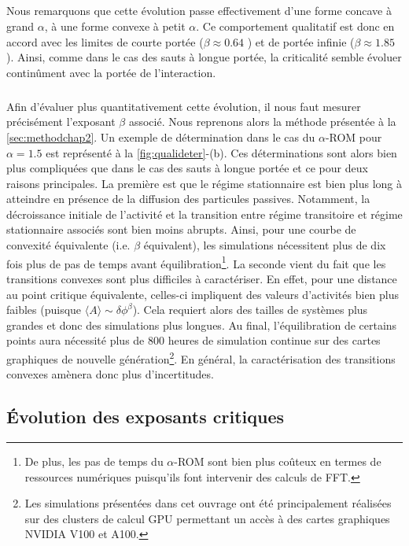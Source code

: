 \subparagraph{}Nous remarquons que cette évolution passe effectivement d'une forme concave à grand $\alpha$, à une forme convexe à petit $\alpha$. Ce comportement qualitatif est donc en accord avec les limites de courte portée ($\beta  \approx 0.64$ \cite{lubeck_universal_2004}) et de portée infinie ($\beta\approx 1.85$ \cite{mari_absorbing_2022}). Ainsi, comme dans le cas des sauts à longue portée, la criticalité semble évoluer continûment avec la portée de l'interaction.

\subparagraph{}Afin d'évaluer plus quantitativement cette évolution, il nous faut mesurer précisément l'exposant $\beta$ associé. Nous reprenons alors la méthode présentée à la \autoref{sec:methodchap2}. Un exemple de détermination dans le cas du $\alpha$-ROM pour $\alpha = 1.5$ est représenté à la \autoref{fig:qualideter}-(b). Ces déterminations sont alors bien plus compliquées que dans le cas des sauts à longue portée et ce pour deux raisons principales. La première est que le régime stationnaire est bien plus long à atteindre en présence de la diffusion des particules passives. Notamment, la décroissance initiale de l'activité et la transition entre régime transitoire et régime stationnaire associés sont bien moins abrupts. Ainsi, pour une courbe de convexité équivalente (i.e. $\beta$ équivalent), les simulations nécessitent plus de dix fois plus de pas de temps avant équilibration\footnote{De plus, les pas de temps du $\alpha$-ROM sont bien plus coûteux en termes de ressources numériques puisqu'ils font intervenir des calculs de FFT.}. La seconde vient du fait que les transitions convexes sont plus difficiles à caractériser. En effet, pour une distance au point critique équivalente, celles-ci impliquent des valeurs d'activités bien plus faibles (puisque $\langle A \rangle \sim \delta\phi^\beta$). Cela requiert alors des tailles de systèmes plus grandes et donc des simulations plus longues. Au final, l'équilibration de certains points aura nécessité plus de 800 heures de simulation continue sur des cartes graphiques de nouvelle génération\footnote{Les simulations présentées dans cet ouvrage ont été principalement réalisées sur des clusters de calcul GPU permettant un accès à des cartes graphiques NVIDIA V100 et A100.}. En général, la caractérisation des transitions convexes amènera donc plus d'incertitudes.

\subsection{Évolution des exposants critiques}

